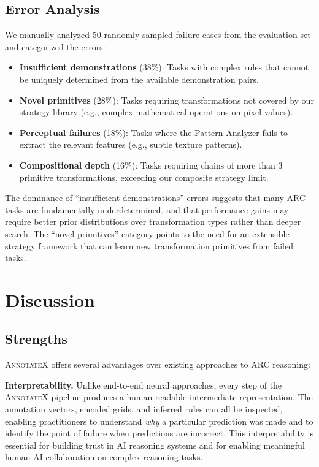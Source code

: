 \documentclass[conference,10pt,letterpaper]{IEEEtran}
\newcommand{\annotatexname}{\textsc{AnnotateX}}
\begin{document}
\subsection{Error Analysis}

We manually analyzed 50 randomly sampled failure cases from the evaluation set and categorized the errors:

\begin{itemize}[leftmargin=*,nosep]
    \item \textbf{Insufficient demonstrations} (38\%): Tasks with complex rules that cannot be uniquely determined from the available demonstration pairs.
    \item \textbf{Novel primitives} (28\%): Tasks requiring transformations not covered by our strategy library (e.g., complex mathematical operations on pixel values).
    \item \textbf{Perceptual failures} (18\%): Tasks where the Pattern Analyzer fails to extract the relevant features (e.g., subtle texture patterns).
    \item \textbf{Compositional depth} (16\%): Tasks requiring chains of more than 3 primitive transformations, exceeding our composite strategy limit.
\end{itemize}

The dominance of ``insufficient demonstrations'' errors suggests that many ARC tasks are fundamentally underdetermined, and that performance gains may require better prior distributions over transformation types rather than deeper search. The ``novel primitives'' category points to the need for an extensible strategy framework that can learn new transformation primitives from failed tasks.

\section{Discussion}
\label{sec:discussion}

\subsection{Strengths}

\annotatexname{} offers several advantages over existing approaches to ARC reasoning:

\textbf{Interpretability.} Unlike end-to-end neural approaches, every step of the \annotatexname{} pipeline produces a human-readable intermediate representation. The annotation vectors, encoded grids, and inferred rules can all be inspected, enabling practitioners to understand \emph{why} a particular prediction was made and to identify the point of failure when predictions are incorrect. This interpretability is essential for building trust in AI reasoning systems and for enabling meaningful human-AI collaboration on complex reasoning tasks.
\end{document}
